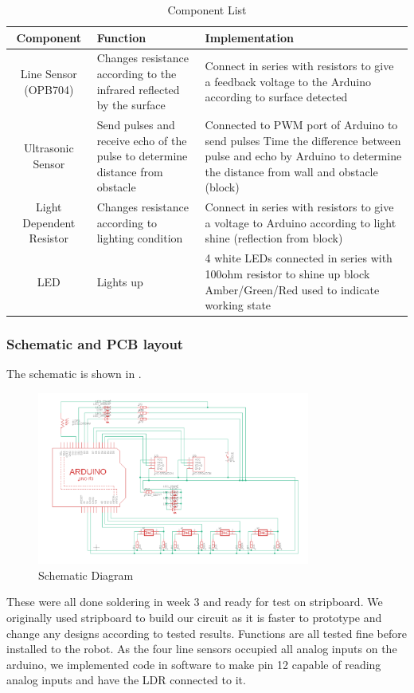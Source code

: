\documentclass{article}
\begin{document}
\begin{table}[!h]
    \centering
    \begin{tabular}{|c|p{5cm}|p{5cm}|}
\hline
Component &
  Function &
  Implementation
   \\
   \hline
Line Sensor (OPB704) &
  Changes resistance according to the infrared reflected by the surface &
  Connect in series with resistors to give a feedback voltage to the Arduino according to surface detected
   \\
   \hline
Ultrasonic Sensor &
  Send pulses and receive echo of the pulse to determine distance from obstacle &
Connected to PWM port of Arduino to send pulses  Time the difference between pulse and echo by Arduino to determine the distance from wall and obstacle (block)
   \\
   \hline
Light Dependent Resistor &
  Changes resistance according to lighting condition &
  Connect in series with resistors   to give a voltage to Arduino according to light shine (reflection from block) 
   \\
   \hline
LED &
  Lights up &
4 white LEDs connected in series with 100ohm resistor to shine up block Amber/Green/Red used to indicate   working state\\
  \hline
    \end{tabular}
    \caption{Component List}
    \label{tab:mount_sens}
\end{table}

\subsubsection{Schematic and PCB layout}
\quad The schematic is shown in .

\begin{figure}[!h]
    \centering
    \includegraphics[width=0.8\textwidth]{assets/Schematic.png}
    \caption{Schematic Diagram}
    \label{fig:sche}
\end{figure}
These were all done soldering in week 3 and ready for test on stripboard. We originally used stripboard to build our circuit as it is faster to prototype and change any designs according to tested results. Functions are all tested fine before installed to the robot.
As the four line sensors occupied all analog inputs on the arduino, we implemented code in software to make pin 12 capable of  reading analog inputs and have the LDR connected to it.
\end{document}
